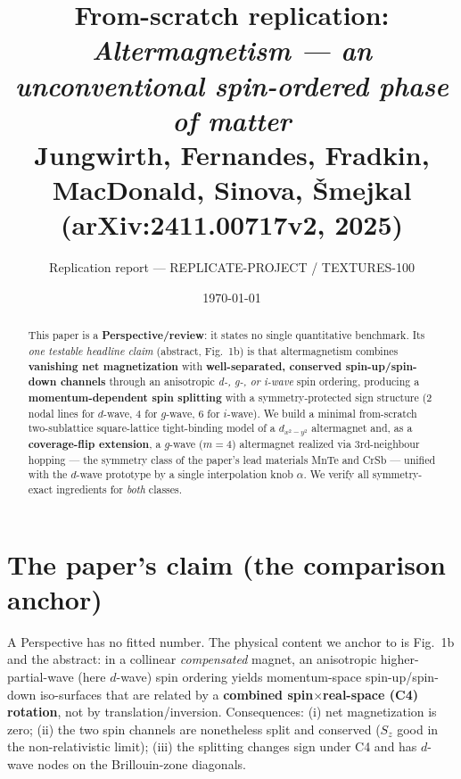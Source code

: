 \documentclass[11pt]{article}
\title{From-scratch replication: \emph{Altermagnetism --- an unconventional spin-ordered phase of matter}\\
\large Jungwirth, Fernandes, Fradkin, MacDonald, Sinova, \v{S}mejkal (arXiv:2411.00717v2, 2025)}
\author{Replication report --- REPLICATE-PROJECT / TEXTURES-100}
\date{\today}
\begin{document}
\maketitle

\begin{abstract}
This paper is a \textbf{Perspective/review}: it states no single quantitative benchmark. Its
\emph{one testable headline claim} (abstract, Fig.~1b) is that altermagnetism combines
\textbf{vanishing net magnetization} with \textbf{well-separated, conserved spin-up/spin-down
channels} through an anisotropic \emph{d-, g-, or i-wave} spin ordering, producing a
\textbf{momentum-dependent spin splitting} with a symmetry-protected sign structure (2 nodal
lines for $d$-wave, 4 for $g$-wave, 6 for $i$-wave). We build a minimal from-scratch
two-sublattice square-lattice tight-binding model of a $d_{x^2-y^2}$ altermagnet and, as a
\textbf{coverage-flip extension}, a $g$-wave ($m=4$) altermagnet realized via 3rd-neighbour
hopping --- the symmetry class of the paper's lead materials MnTe and CrSb --- unified with the
$d$-wave prototype by a single interpolation knob $\alpha$. We verify all symmetry-exact
ingredients for \emph{both} classes.
\end{abstract}

\section{The paper's claim (the comparison anchor)}
A Perspective has no fitted number. The physical content we anchor to is Fig.~1b and the abstract:
in a collinear \emph{compensated} magnet, an anisotropic higher-partial-wave (here $d$-wave) spin
ordering yields momentum-space spin-up/spin-down iso-surfaces that are related by a
\textbf{combined spin$\times$real-space (C4) rotation}, not by translation/inversion. Consequences:
(i) net magnetization is zero; (ii) the two spin channels are nonetheless split and conserved
($S_z$ good in the non-relativistic limit); (iii) the splitting changes sign under C4 and has
$d$-wave nodes on the Brillouin-zone diagonals.
\end{document}
